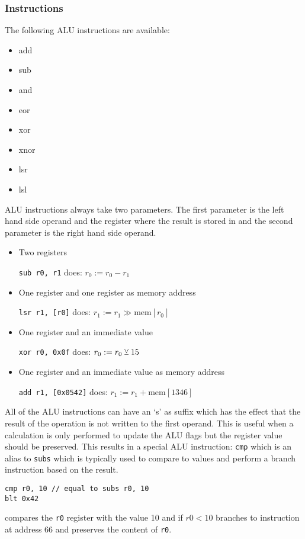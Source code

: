 \subsubsection{ Instructions}
The following \gls{ALU} instructions are available:
\begin{multicols}{4}
  \begin{itemize}
    \item add
    \item sub
    \item and
    \item eor
    \item xor
    \item xnor
    \item lsr
    \item lsl
  \end{itemize}
\end{multicols}
\gls{ALU} instructions always take two parameters. The first parameter is the left hand side operand and the register where the result is stored in and the second parameter is the right hand side operand.
\begin{itemize}
  \item Two registers

        \qquad\texttt{sub r0, r1} does: $r_0:=r_0-r_1$
  \item One register and one register as memory address

        \qquad\texttt{lsr r1, [r0]} does: $r_1:=r_1\gg\text{mem}[r_0]$
  \item One register and an immediate value

        \qquad\texttt{xor r0, 0x0f} does: $r_0:=r_0\veebar 15$
  \item One register and an immediate value as memory address

        \qquad\texttt{add r1, [0x0542]} does: $r_1:=r_1+\text{mem}[1346]$
\end{itemize}
All of the \gls{ALU} instructions can have an `s' as suffix which has the effect that the result of the operation is not written to the first operand.
This is useful when a calculation is only performed to update the \gls{ALU} flags but the register value should be preserved.
This results in a special \gls{ALU} instruction: \texttt{cmp} which is an alias to \texttt{subs} which is typically used to compare to values and perform a branch instruction based on the result.
\begin{verbatim}
cmp r0, 10 // equal to subs r0, 10
blt 0x42
\end{verbatim}
compares the \texttt{r0} register with the value 10 and if $r0 < 10$ branches to instruction at address 66 and preserves the content of \texttt{r0}.

